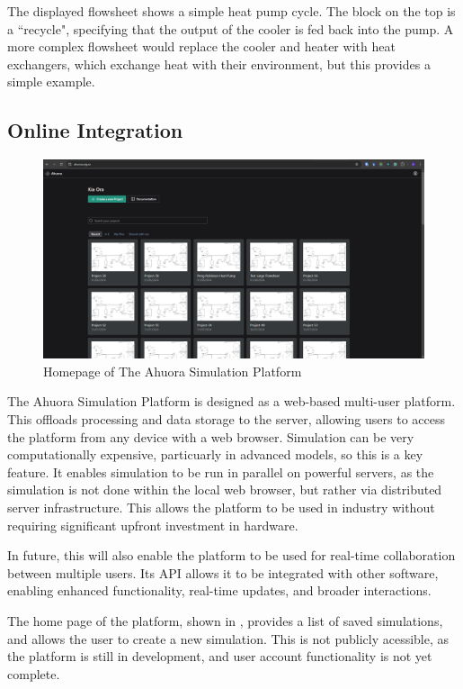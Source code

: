 The displayed flowsheet shows a simple heat pump cycle. The block on the top is a ``recycle", specifying that the output of the cooler is fed back into the pump. A more complex flowsheet would replace the cooler and heater with heat exchangers, which exchange heat with their environment, but this provides a simple example.

\subsection{Online Integration}

\begin{figure}
    \centering
    \includegraphics[width=\textwidth]{platform_homepage.png}
    \caption{Homepage of The Ahuora Simulation Platform}
    \label{fig:homepage}
\end{figure}

The Ahuora Simulation Platform is designed as a web-based multi-user platform. This offloads processing and data storage to the server, allowing users to access the platform from any device with a web browser. Simulation can be very computationally expensive, particuarly in advanced models, so this is a key feature. It enables simulation to be run in parallel on powerful servers, as the simulation is not done within the local web browser, but rather via distributed server infrastructure. This allows the platform to be used in industry without requiring significant upfront investment in hardware. 

In future, this will also enable the platform to be used for real-time collaboration between multiple users. Its API allows it to be integrated with other software, enabling enhanced functionality, real-time updates, and broader interactions.

The home page of the platform, shown in , provides a list of saved simulations, and allows the user to create a new simulation. This is not publicly acessible, as the platform is still in development, and user account functionality is not yet complete.

